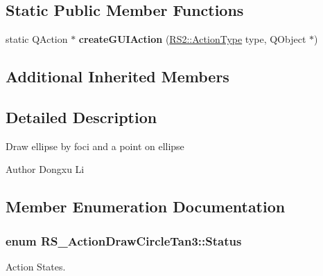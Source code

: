 \subsection*{Static Public Member Functions}
\begin{DoxyCompactItemize}
\item 
\hypertarget{classRS__ActionDrawCircleTan3_ab6642c3f8d43af0a616594641e190495}{static Q\-Action $\ast$ {\bfseries create\-G\-U\-I\-Action} (\hyperlink{classRS2_afe3523e0bc41fd637b892321cfc4b9d7}{R\-S2\-::\-Action\-Type} type, Q\-Object $\ast$)}\label{classRS__ActionDrawCircleTan3_ab6642c3f8d43af0a616594641e190495}

\end{DoxyCompactItemize}
\subsection*{Additional Inherited Members}


\subsection{Detailed Description}
Draw ellipse by foci and a point on ellipse

\begin{DoxyAuthor}{Author}
Dongxu Li 
\end{DoxyAuthor}


\subsection{Member Enumeration Documentation}
\hypertarget{classRS__ActionDrawCircleTan3_aa9122b5e64b1da79fcb653f3271ef53f}{
\subsubsection[{Status}]{\setlength{\rightskip}{0pt plus 5cm}enum {\bf R\-S\-\_\-\-Action\-Draw\-Circle\-Tan3\-::\-Status}}}\label{classRS__ActionDrawCircleTan3_aa9122b5e64b1da79fcb653f3271ef53f}
Action States. 

